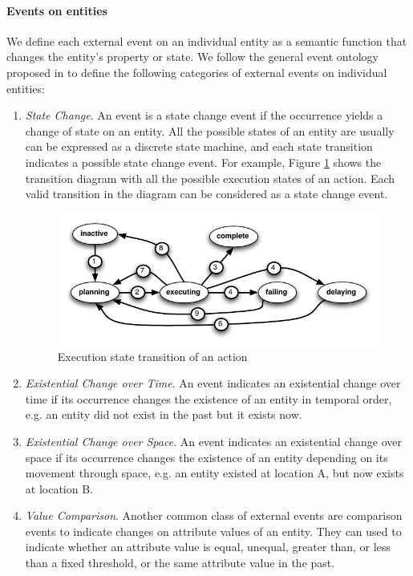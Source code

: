 \paragraph*{Events on entities} %
\label{par:events_on_entities_}
We define each external event on an individual entity as a semantic function that changes the entity's property or state. We follow the general event ontology proposed in \cite{Kaneiwa2007} to define the following categories of external events on individual entities:

\begin{enumerate}
	\item \emph{State Change}. An event is a state change event if the occurrence yields a change of state on an entity. All the possible states of an entity are usually can be expressed as a discrete state machine, and each state transition indicates a possible state change event. For example, Figure \ref{fig:action_exec_state_trans} shows the transition diagram with all the possible execution states of an action. Each valid transition in the diagram can be considered as a state change event.
	\begin{figure}[htbp] %
   	\centering
   	\includegraphics{action_exec_state_trans.pdf} 
   	\caption{Execution state transition of an action}
   	\label{fig:action_exec_state_trans}
	\end{figure}
	\item \emph{Existential Change over Time}. An event indicates an existential change over time if its occurrence changes the existence of an entity in temporal order, e.g. an entity did not exist in the past but it exists now.
	\item \emph{Existential Change over Space}. An event indicates an existential change over space if its occurrence changes the existence of an entity depending on its movement through space, e.g. an entity existed at location A, but now exists at location B. 
	\item \emph{Value Comparison}. Another common class of external events are comparison events to indicate changes on attribute values of an entity. They can used to indicate whether an attribute value is equal, unequal, greater than, or less than a fixed threshold, or the same attribute value in the past. 
\end{enumerate}

